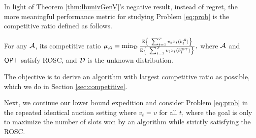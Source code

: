  
 In light of Theorem \ref{thm:lbunivGenV}'s negative result,  instead of regret, the more meaningful performance metric for studying Problem \eqref{eq:prob} is the competitive ratio \cite{vaze2023online} defined as follows. 
\begin{definition}\label{defn:compratio} For any $\mathcal{A}$, its competitive ratio
  $\mu_{\cA} = \min_{\cD} \frac{ \bbE\left\{\ \sum_{t=1}^T v_t x_t(b^\cA_t)\right\} }{ \bbE\left\{\ \sum_{t=1}^T v_t x_t(b^\opt_t)\right\} },$
  where  $\mathcal{A}$ and $\mathsf{OPT}$ satisfy ROSC, and $\mathcal{D}$ is the unknown distribution.
\end{definition} The objective is to derive an algorithm with largest competitive ratio as possible, which we do in Section \ref{sec:competitive}. 


Next, we continue our lower bound expedition and consider Problem \ref{eq:prob} in the repeated identical auction setting where $v_t=v$ for all $t$, where the goal is only to maximize the number of slots won by an algorithm while strictly satisfying the ROSC.